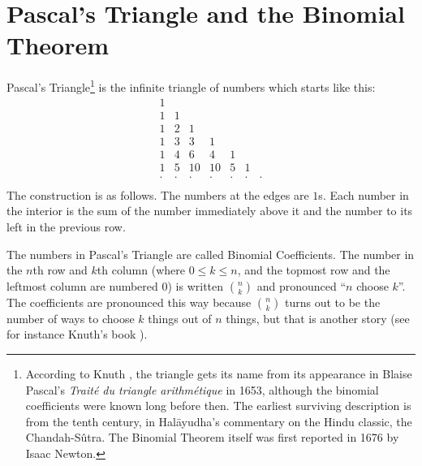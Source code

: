 
\setlength{\unitlength}{1mm}

\def\obj#1{\mbox{\tt#1}}

%

\section{Pascal's Triangle and the Binomial Theorem}

Pascal's Triangle\footnote{
According to Knuth \cite{knuth73}, the triangle gets its name from
its appearance in Blaise Pascal's {\em Trait\'e du triangle arithm\'etique}
in 1653, although the binomial coefficients were known long before then.
The earliest surviving description is from the tenth century,
in Hal\={a}yudha's commentary on the Hindu classic, the Chandah-S\^{u}tra.
The Binomial Theorem itself was first reported in 1676 by Isaac Newton.
}
is the infinite triangle of numbers which starts like this:
\[\begin{array}{ccccccc}
1  \\
1 & 1 \\
1 & 2 & 1 \\
1 & 3 & 3 & 1 \\
1 & 4 & 6 & 4 & 1 \\
1 & 5 & 10 & 10 & 5 & 1 \\
\cdot & \cdot & \cdot & \cdot & \cdot & \cdot & \cdot \\
\end{array}\]
The construction is as follows. The numbers at the edges 
are $1$s. Each number in the interior is the sum of the number immediately 
above it and the number to its left in the previous row.

The numbers in Pascal's Triangle are called Binomial Coefficients. 
The number in the $n$th row and $k$th column (where $0 \leq k \leq n$, and the 
topmost row and the leftmost column are numbered $0$) is written 
$n \choose k$ and pronounced ``$n$ choose $k$''.  The coefficients are 
pronounced this way because $n \choose k$ turns out to be the number of 
ways to choose $k$ things out of $n$ things, but that is another story
(see for instance Knuth's book \cite{knuth73}).

